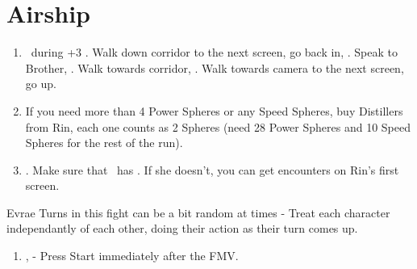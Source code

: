\chapter{Airship}

\begin{enumerate}
    \item \sd\ during \cs+3 \skippablefmv. Walk down corridor to the next screen, go back in, \sd. Speak to Brother, \sd. Walk towards corridor, \sd. Walk towards camera to the next screen, go up.
    \item If you need more than 4 Power Spheres or any Speed Spheres, buy Distillers from Rin, each one counts as 2 Spheres (need 28 Power Spheres and 10 Speed Spheres for the rest of the run).
    \item \save. Make sure that \rikku\ has \od. If she doesn't, you can get encounters on Rin's first screen.
\end{enumerate}
\begin{battle}[32000]{Evrae}
    Turns in this fight can be a bit random at times - Treat each character independantly of each other, doing their action as their turn comes up.
    \begin{itemize}
    \end{itemize}
\end{battle}
\begin{enumerate}[resume]
    \item \sd, \skippablefmv[3:00] - Press Start immediately after the FMV.
\end{enumerate}
\wincb
